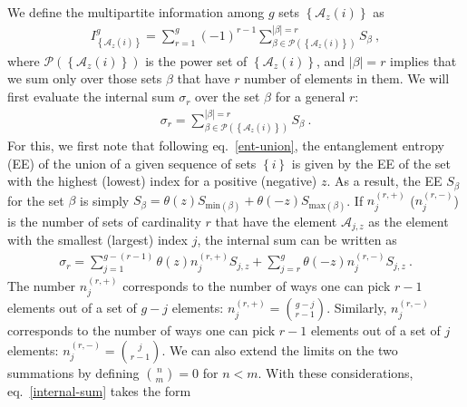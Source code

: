 We define the multipartite information among \(g\) sets \(\left\{ \mathcal{A}_{z}(i)\right\} \) as~\cite{siddhartha_TEE}
\begin{equation}\begin{aligned}
	I^g_{\left\{ \mathcal{A}_{z}(i) \right\}} = \sum_{r=1}^g \left( -1 \right)^{r-1} \sum_{\beta \in \mathcal{P}\left(\left\{ \mathcal{A}_{z}(i) \right\}\right)}^{|\beta|=r} S_\beta~,
\end{aligned}\end{equation}
where \(\mathcal{P}\left(\left\{ \mathcal{A}_{z}(i) \right\}\right)\) is the power set of \(\left\{ \mathcal{A}_{z}(i) \right\}\), and \(|\beta|=r\) implies that we sum only over those sets \(\beta\) that have \(r\) number of elements in them. We will first evaluate the internal sum \(\sigma_r\) over the set \(\beta\) for a general \(r\): 
\begin{equation}\begin{aligned}
\sigma_r = \sum_{\beta \in \mathcal{P}\left(\left\{ \mathcal{A}_{z}(i) \right\}\right)}^{|\beta|=r} S_\beta~.
\end{aligned}\end{equation}
For this, we first note that following eq.~\eqref{ent-union}, the entanglement entropy (EE) of the union of a given sequence of sets \(\left\{ i \right\} \) is given by the EE of the set with the highest (lowest) index for a positive (negative) \(z\). As a result, the EE \(S_\beta\) for the set \(\beta\) is simply \(S_\beta = \theta(z)S_{\text{min}(\beta)} + \theta(-z)S_{\text{max}(\beta)}\). If \(n^{(r,+)}_j\) (\(n^{(r,-)}_j\)) is the number of sets of cardinality \(r\) that have the element \(\mathcal{A}_{j,z}\) as the element with the smallest (largest) index \(j\), the internal sum can be written as
\begin{equation}\begin{aligned}\label{internal-sum}
	\sigma_r = \sum_{j=1}^{g-(r-1)} \theta(z) n_j^{(r,+)} S_{j,z} + \sum_{j=r}^{g}\theta(-z) n_j^{(r,-)} S_{j,z}~.
\end{aligned}\end{equation}
The number \(n_j^{(r,+)}\) corresponds to the number of ways one can pick \(r-1\) elements out of a set of \(g-j\) elements: 
\(n_j^{(r,+)} = {{g-j}\choose{r-1}}\). Similarly, \(n_j^{(r,-)}\) corresponds to the number of ways one can pick \(r-1\) elements out of a set of \(j\) elements: \(n^{(r,-)}_j = {{j}\choose{r-1}}\). We can also extend the limits on the two summations by defining \({n\choose m} = 0 \) for \( n < m\). With these considerations, eq.~\eqref{internal-sum} takes the form
